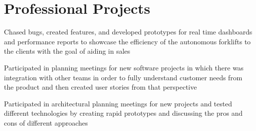 \documentclass[letterpaper]{resume}
\begin{document}
\author{Sarah F. Majors}
\maketitle

%

\section{Professional Projects}

\begin{compactitem}
\item Chased bugs, created features, and developed prototypes for real time dashboards and performance reports to showcase the efficiency of the autonomous forklifts to the clients with the goal of aiding in sales
\item Participated in planning meetings for new software projects in which there was integration with other teams in order to fully understand customer needs from the product and then created user stories from that perspective
\item Participated in architectural planning meetings for new projects and tested different technologies by creating rapid prototypes and discussing the pros and cons of different approaches
\end{compactitem}
\end{document}

